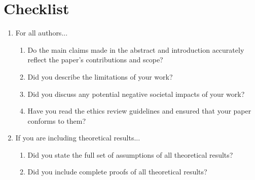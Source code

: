 
\section*{Checklist}



\begin{enumerate}

\item For all authors...
\begin{enumerate}
  \item Do the main claims made in the abstract and introduction accurately reflect the paper's contributions and scope?
    \answerYes{}
  \item Did you describe the limitations of your work?
  \item Did you discuss any potential negative societal impacts of your work?
  \item Have you read the ethics review guidelines and ensured that your paper conforms to them?
\end{enumerate}

\item If you are including theoretical results...
\begin{enumerate}
  \item Did you state the full set of assumptions of all theoretical results?
	\item Did you include complete proofs of all theoretical results?
\end{enumerate}


\end{enumerate}
